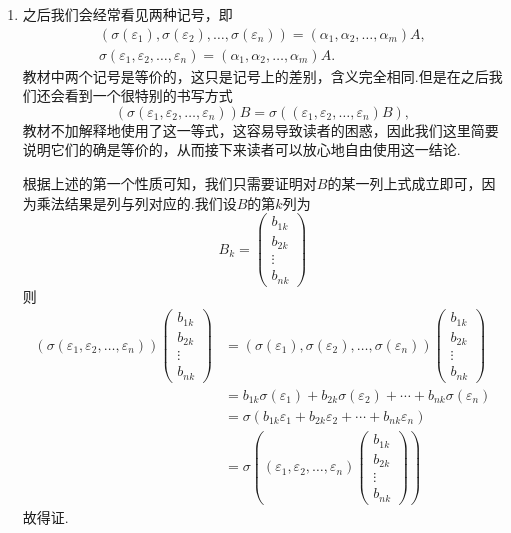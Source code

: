 \begin{enumerate}
    \item 之后我们会经常看见两种记号，即
    \begin{gather*}
        (\sigma(\varepsilon_1),\sigma(\varepsilon_2),\ldots,\sigma(\varepsilon_n))=(\alpha_1,\alpha_2,\ldots,\alpha_m)A, \\
        \sigma(\varepsilon_1,\varepsilon_2,\ldots,\varepsilon_n)=(\alpha_1,\alpha_2,\ldots,\alpha_m)A.
    \end{gather*}
    教材中两个记号是等价的，这只是记号上的差别，含义完全相同.但是在之后我们还会看到一个很特别的书写方式
    \[(\sigma(\varepsilon_1,\varepsilon_2,\ldots,\varepsilon_n))B=\sigma((\varepsilon_1,\varepsilon_2,\ldots,\varepsilon_n)B),\]
    教材不加解释地使用了这一等式，这容易导致读者的困惑，因此我们这里简要说明它们的确是等价的，从而接下来读者可以放心地自由使用这一结论.
    
    根据上述的第一个性质可知，我们只需要证明对$B$的某一列上式成立即可，因为乘法结果是列与列对应的.我们设$B$的第$k$列为
    \[B_k=\begin{pmatrix}
        b_{1k} \\ b_{2k} \\ \vdots \\ b_{nk}
    \end{pmatrix}\]
    则
    \begin{align*}
        (\sigma(\varepsilon_1,\varepsilon_2,\ldots,\varepsilon_n))\begin{pmatrix}
            b_{1k} \\ b_{2k} \\ \vdots \\ b_{nk}
        \end{pmatrix}&=(\sigma(\varepsilon_1),\sigma(\varepsilon_2),\ldots,\sigma(\varepsilon_n))\begin{pmatrix}
            b_{1k} \\ b_{2k} \\ \vdots \\ b_{nk}
        \end{pmatrix}\\&=b_{1k}\sigma(\varepsilon_1)+b_{2k}\sigma(\varepsilon_2)+\cdots+b_{nk}\sigma(\varepsilon_n)
        \\&=\sigma(b_{1k}\varepsilon_1+b_{2k}\varepsilon_2+\cdots+b_{nk}\varepsilon_n)
        \\&=\sigma((\varepsilon_1,\varepsilon_2,\ldots,\varepsilon_n)\begin{pmatrix}
            b_{1k} \\ b_{2k} \\ \vdots \\ b_{nk}
        \end{pmatrix})
    \end{align*}
    故得证.
\end{enumerate}

